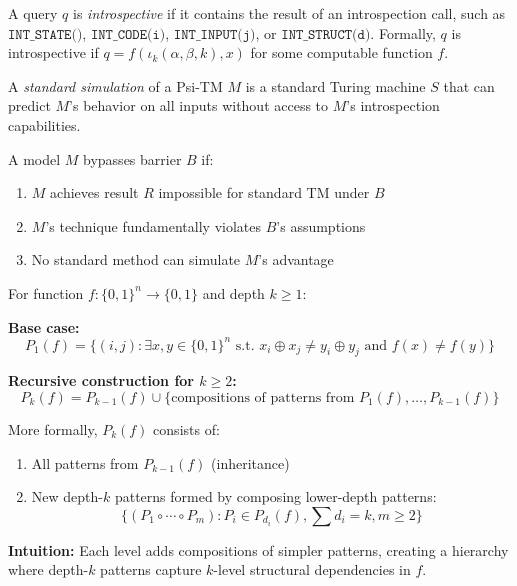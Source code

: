 \documentclass[11pt]{article}
\begin{document}
\begin{definition}
A query $q$ is \textit{introspective} if it contains the result of an introspection call, such as $\texttt{INT\_STATE()}$, $\texttt{INT\_CODE(i)}$, $\texttt{INT\_INPUT(j)}$, or $\texttt{INT\_STRUCT(d)}$. Formally, $q$ is introspective if $q = f(\iota_k(\alpha, \beta, k), x)$ for some computable function $f$.
\end{definition}

\begin{definition}
A \textit{standard simulation} of a Psi-TM $M$ is a standard Turing machine $S$ that can predict $M$'s behavior on all inputs without access to $M$'s introspection capabilities.
\end{definition}

\begin{definition}
A model $M$ bypasses barrier $B$ if:
\begin{enumerate}
\item $M$ achieves result $R$ impossible for standard TM under $B$
\item $M$'s technique fundamentally violates $B$'s assumptions
\item No standard method can simulate $M$'s advantage
\end{enumerate}
\end{definition}

\begin{definition}
For function $f: \{0,1\}^n \to \{0,1\}$ and depth $k \geq 1$:

\textbf{Base case:}
$$P_1(f) = \{(i,j) : \exists x,y \in \{0,1\}^n \text{ s.t. } x_i \oplus x_j \neq y_i \oplus y_j \text{ and } f(x) \neq f(y)\}$$

\textbf{Recursive construction for $k \geq 2$:}
$$P_k(f) = P_{k-1}(f) \cup \{\text{compositions of patterns from } P_1(f), \ldots, P_{k-1}(f)\}$$

More formally, $P_k(f)$ consists of:
\begin{enumerate}
\item All patterns from $P_{k-1}(f)$ (inheritance)
\item New depth-$k$ patterns formed by composing lower-depth patterns:
   $$\{(P_1 \circ \cdots \circ P_m) : P_i \in P_{d_i}(f), \sum d_i = k, m \geq 2\}$$
\end{enumerate}

\textbf{Intuition:} Each level adds compositions of simpler patterns, creating a hierarchy where depth-$k$ patterns capture $k$-level structural dependencies in $f$.
\end{definition}
\end{document}

